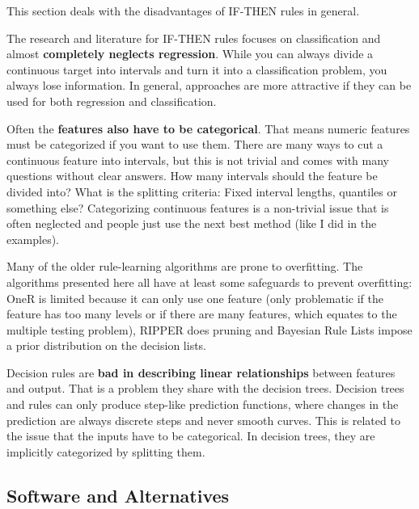 \documentclass[
  11pt,
]{scrbook}
\begin{document}
This section deals with the disadvantages of IF-THEN rules in general.

The research and literature for IF-THEN rules focuses on classification and almost \textbf{completely neglects regression}.
While you can always divide a continuous target into intervals and turn it into a classification problem, you always lose information.
In general, approaches are more attractive if they can be used for both regression and classification.

Often the \textbf{features also have to be categorical}.
That means numeric features must be categorized if you want to use them.
There are many ways to cut a continuous feature into intervals, but this is not trivial and comes with many questions without clear answers.
How many intervals should the feature be divided into?
What is the splitting criteria: Fixed interval lengths, quantiles or something else?
Categorizing continuous features is a non-trivial issue that is often neglected and people just use the next best method (like I did in the examples).

Many of the older rule-learning algorithms are prone to overfitting.
The algorithms presented here all have at least some safeguards to prevent overfitting:
OneR is limited because it can only use one feature (only problematic if the feature has too many levels or if there are many features, which equates to the multiple testing problem), RIPPER does pruning and Bayesian Rule Lists impose a prior distribution on the decision lists.

Decision rules are \textbf{bad in describing linear relationships} between features and output.
That is a problem they share with the decision trees.
Decision trees and rules can only produce step-like prediction functions, where changes in the prediction are always discrete steps and never smooth curves.
This is related to the issue that the inputs have to be categorical.
In decision trees, they are implicitly categorized by splitting them.

\hypertarget{software-and-alternatives}{%
\subsection{Software and Alternatives}\label{software-and-alternatives}}
\end{document}
